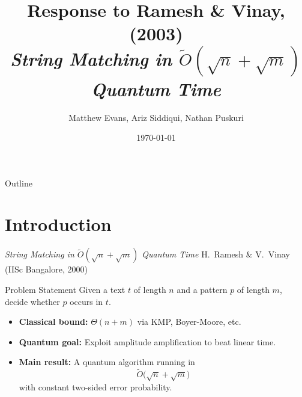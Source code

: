 \documentclass{beamer}
\title{\Large{Response to Ramesh \& Vinay, (2003)} \\
\small{\texorpdfstring{\textit{String Matching in \(\tilde{O}(\sqrt{n} + \sqrt{m})\) Quantum Time}}{String Matching in O(sqrt(n) + sqrt(m)) Quantum Time}}
}
\author{Matthew Evans, Ariz Siddiqui, Nathan Puskuri}
\date{\today}
\begin{document}
\begin{frame}
    \titlepage
\end{frame}

\begin{frame}{Outline}
    \tableofcontents
\end{frame}

\section{Introduction}
\begin{frame}{\texorpdfstring{\textit{String Matching in \(\tilde{O}(\sqrt{n} + \sqrt{m})\) Quantum Time}}{String Matching in O(sqrt(n) + sqrt(m)) Quantum Time}}
    \normalsize
    H.\ Ramesh \& V.\ Vinay (IISc Bangalore, 2000)\\
    \vfill
    \begin{block}{Problem Statement}
        Given a text $t$ of length $n$ and a pattern $p$ of length $m$, decide whether $p$ occurs in $t$.
    \end{block}
    \vfill
    \begin{itemize}
        \item \textbf{Classical bound:} $\Theta(n + m)$ via KMP, Boyer-Moore, etc.
        \item \textbf{Quantum goal:} Exploit amplitude amplification to beat linear time.
        \item \textbf{Main result:} A quantum algorithm running in
              \[
                  \widetilde{O}\bigl(\sqrt{n} + \sqrt{m}\bigr)
              \]
              with constant two-sided error probability.
    \end{itemize}
\end{frame}
\end{document}
